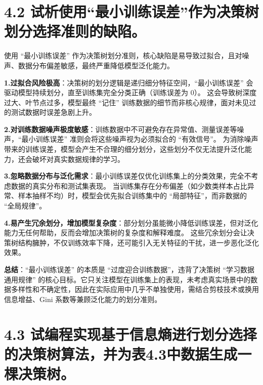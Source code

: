 
\section*{4.2 试析使用“最小训练误差”作为决策树划分选择准则的缺陷。}

使用 “最小训练误差” 作为决策树划分准则，核心缺陷是易导致过拟合，且对噪声、数据分布偏差敏感，最终严重降低模型泛化能力。

\textbf{1.过拟合风险极高}：决策树的划分逻辑是递归细分特征空间，“最小训练误差” 会驱动模型持续划分，直至训练集完全分类正确（训练误差为 0）。
这会导致树深度过大、叶节点过多，模型最终 “记住” 训练数据的细节而非核心规律，面对未见过的测试数据时误差急剧上升。

\textbf{2.对训练数据噪声极度敏感}：训练数据中不可避免存在异常值、测量误差等噪声，“最小训练误差” 准则会将这些噪声视为必须拟合的 “有效信号”。
为消除噪声带来的训练误差，模型会产生不合理的细分划分，这些划分不仅无法提升泛化能力，还会破坏对真实数据规律的学习。

\textbf{3.忽略数据分布与泛化需求}：最小训练误差仅优化训练集上的分类效果，完全不考虑数据的真实分布和测试集表现。
当训练集存在分布偏差（如少数类样本占比异常、样本抽样不均）时，模型会优先拟合训练集中的 “局部特征”，而非数据的 “全局规律”。

\textbf{4.易产生冗余划分，增加模型复杂度}：部分划分虽能微小降低训练误差，但对泛化能力无任何帮助，反而会增加决策树的复杂度和解释难度。
这些冗余划分会让决策树结构臃肿，不仅训练效率下降，还可能引入无关特征的干扰，进一步恶化泛化效果。

\textbf{总结}：“最小训练误差” 的本质是 “过度迎合训练数据”，违背了决策树 “学习数据通用规律” 的核心目标。它只关注模型在训练集上的表现，未考虑真实场景中的数据多样性和不确定性，因此在实际应用中几乎不单独使用，需结合剪枝技术或换用信息增益、Gini 系数等兼顾泛化能力的划分准则。

\clearpage  %


\section*{4.3 试编程实现基于信息熵进行划分选择的决策树算法，并为表4.3中数据生成一棵决策树。}

